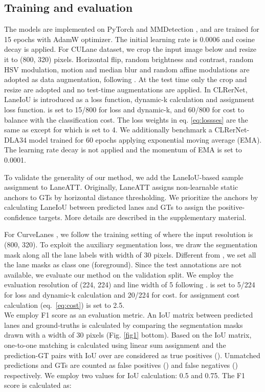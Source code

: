 \documentclass[10pt,twocolumn,letterpaper]{article}
\begin{document}
\subsection {Training and evaluation}\label{subsec:train_eval}
The models are implemented on PyTorch and MMDetection \cite{mmdetection}, and are trained for 15 epochs with AdamW \cite{loshchilov2018decoupled} optimizer. The initial learning rate is 0.0006 and cosine decay is applied. For CULane dataset, we crop the input image below  and resize it to (800, 320) pixels. Horizontal flip, random brightness and contrast, random HSV modulation, motion and median blur and random affine modulations are adopted as data augmentation, following \cite{Zheng_2022_CVPR}. At the test time only the crop and resize are adopted and no test-time augmentations are applied.
In CLRerNet, LaneIoU is introduced as a loss function, dynamic-k calculation and assignment loss function.  is set to 15/800 for loss and dynamic-k, and 60/800 for cost to balance with the classification cost. The loss weights in eq. \ref{eq:lossses} are the same as \cite{Zheng_2022_CVPR} except for  which is set to 4. 
We additionally benchmark a CLRerNet-DLA34 model trained for 60 epochs applying exponential moving average (EMA). The learning rate decay is not applied and the momentum of EMA is set to 0.0001.

To validate the generality of our method, we add the LaneIoU-based sample assignment to LaneATT\cite{tabelini2021cvpr}.
Originally, LaneATT assigns non-learnable static anchors to GTs by horizontal distance thresholding.
We prioritize the anchors by calculating LaneIoU between predicted lanes and GTs to assign the positive-confidence targets.
More details are described in the supplementary material.

For CurveLanes \cite{CurveLane-NAS}, we follow the training setting of \cite{Liu_2021_ICCV} where the input resolution is (800, 320). To exploit the auxiliary segmentation loss, we draw the segmentation mask along all the lane labels with width of 30 pixels. Different from \cite{pan2018SCNN}, we set all the lane masks as class one (foreground). Since the test annotations are not available, we evaluate our method on the validation split. We employ the evaluation resolution of (224, 224) and line width of 5 following \cite{Liu_2021_ICCV}.  is set to 5/224 for loss and dynamic-k calculation and 20/224 for cost.  for assignment cost calculation (eq. \ref{eq:cost}) is set to 2.5. \\
We employ F1 score \cite{pan2018SCNN} as an evaluation metric.
An IoU matrix between predicted lanes and ground-truths is calculated by comparing the segmentation masks drawn with a width of 30 pixels (Fig. \ref{fig1} bottom).
Based on the IoU matrix, one-to-one matching is calculated using linear sum assignment and the prediction-GT pairs with IoU over  are considered as true positives (). Unmatched predictions and GTs are counted as false positives () and false negatives () respectively.
We employ two  values for IoU calculation: 0.5 and 0.75. The F1 score is calculated as:
\end{document}
